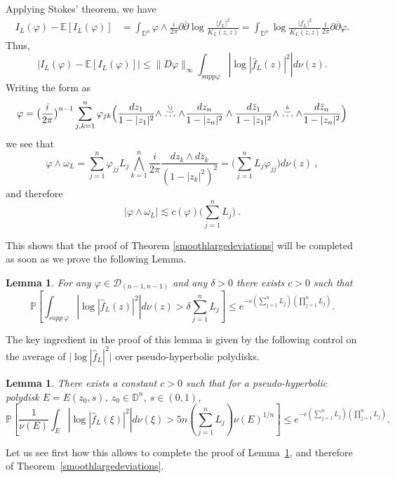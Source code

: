\documentclass[12pt,twoside,final,amsfonts]{amsart}
\theoremstyle{plain}
\newtheorem{lemma}[theorem]{Lemma}
\theoremstyle{definition}
\theoremstyle{definition}
\begin{document}
Applying Stokes' theorem, we have
\begin{align*}
I_{L}(\varphi)-{\mathbb{E}}\left[I_{L}(\varphi)\right]&
 =\int_{{\mathbb{D}}^n}\varphi\wedge \frac{i}{2\pi}\partial\overline{\partial}\log\frac{|f_L|^2}{K_L(z,z)}
=\int_{{\mathbb{D}}^n}\log\frac{| f_L|^2}{K_L(z,z)}\frac{i}{2\pi}\partial\overline{\partial}\varphi.
\end{align*}
Thus,
\[
|I_{L}(\varphi)-{\mathbb{E}}[I_{L}(\varphi)]|\leq \|D\varphi\|_\infty \int_{\text{supp}\varphi}\left|\log |\hat f_{L}(z)|^2\right|d\nu(z).
\]
Writing the form as
\[
 \varphi=\bigl(\frac i{2\pi}\bigr)^{n-1} \sum_{j,k=1}^n\varphi_{jk}\Bigl(\frac{dz_1}{1-|z_1|^2}\wedge\stackrel{\stackrel{\hat \j}{\smile}}{\dots}\wedge\frac{dz_n}{1-|z_n|^2}\wedge \frac{d\bar z_1}{1-|z_1|^2}\wedge\stackrel{\stackrel{\hat k}{\smile}}{\dots}\wedge\frac{d\bar z_n}{1-|z_n|^2} \Bigr)
\]
we see that
\[
 \varphi\wedge\omega_L=\sum_{j=1}^n\varphi_{jj} L_j\bigwedge_{k=1}^n\frac i{2\pi}\frac{dz_k\wedge d\bar z_k}{(1-|z_k|^2)^2}=\bigl(\sum_{j=1}^n L_j\varphi_{jj}\bigr) d\nu(z)\ ,
\]
and therefore
\begin{equation}\label{phiomega}
 \bigl|\varphi\wedge\omega_L\bigr|\lesssim c(\varphi) \bigl(\sum_{j=1}^n L_j \bigr)\ .
\end{equation}

This shows that the proof of Theorem \ref{smoothlargedeviations} will be completed as soon as we prove the following Lemma.

\begin{lemma}\label{mainlemmaSLD}
For any $\varphi\in\mathcal D_{(n-1,n-1)}$ and any $\delta>0$ there exists $c>0$ such that
\[
\mathbb P\left[ \int_{supp\ \varphi}\left|\log |\hat f_L(z)|^2 \right|d\nu(z)>\delta {\sum_{j=1}^n L_j} \right]\leq e^{-c{(\sum_{j=1}^n L_j)(\prod_{j=1}^n L_j)}}.
\]
\end{lemma}
The key ingredient in the proof of this lemma is given by the following control on the average of
$\bigl|\log |\hat f_L|^2\bigr|$ over pseudo-hyperbolic polydisks.

\begin{lemma}\label{controlmean}
There exists a constant $c>0$ such that for a pseudo-hyperbolic polydisk $E=E(z_0,s)$, $z_0\in{\mathbb{D}}^n$, $s\in (0,1)$,
\[
\mathbb P\left[\frac{1}{\nu(E)}\int_{E}\left|\log |\hat f_L(\xi)|^2 \right|d\nu(\xi)>5 n({\sum_{j=1}^n L_j})\nu(E)^{1/n} \right]\leq e^{-c{(\sum_{j=1}^n L_j)(\prod_{j=1}^n L_j)}}.
\]
\end{lemma}

Let us see first how this allows to complete the proof of Lemma~\ref{mainlemmaSLD}, and therefore of Theorem~\ref{smoothlargedeviations}.
\end{document}
